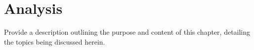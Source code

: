 \chapter{Analysis}
\label{chap:Analysis} 
Provide a description outlining the purpose and content of this chapter, detailing the topics being discussed herein.





